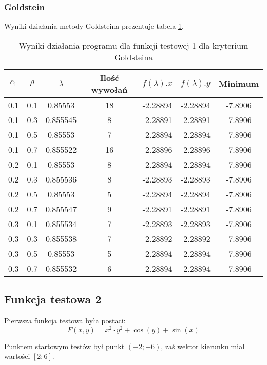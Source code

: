 \documentclass{classrep}
\begin{document}
\subsubsection{Goldstein}

Wyniki działania metody Goldsteina prezentuje tabela \ref{goldstein1}.

\begin{table}
  \centering
  \caption{Wyniki działania programu dla funkcji testowej 1 dla kryterium Goldsteina}
  \label{goldstein1}
  \begin{tabular}{|c|c|c|c|c|c|c|}
    \hline
    $c_1$ & $\rho$ & $\lambda$ & Ilość wywołań & $f(\lambda).x$ & $f(\lambda).y$ & Minimum \\
    \hline
    0.1 & 0.1 & 0.85553 & 18 & -2.28894 & -2.28894 & -7.8906 \\
    0.1 & 0.3 & 0.855545 & 8 & -2.28891 & -2.28891 & -7.8906 \\
    0.1 & 0.5 & 0.85553 & 7 & -2.28894 & -2.28894 & -7.8906 \\
    0.1 & 0.7 & 0.855522 & 16 & -2.28896 & -2.28896 & -7.8906 \\
    0.2 & 0.1 & 0.85553 & 8 & -2.28894 & -2.28894 & -7.8906 \\
    0.2 & 0.3 & 0.855536 & 8 & -2.28893 & -2.28893 & -7.8906 \\
    0.2 & 0.5 & 0.85553 & 5 & -2.28894 & -2.28894 & -7.8906 \\
    0.2 & 0.7 & 0.855547 & 9 & -2.28891 & -2.28891 & -7.8906 \\
    0.3 & 0.1 & 0.855534 & 7 & -2.28893 & -2.28893 & -7.8906 \\
    0.3 & 0.3 & 0.855538 & 7 & -2.28892 & -2.28892 & -7.8906 \\
    0.3 & 0.5 & 0.85553 & 5 & -2.28894 & -2.28894 & -7.8906 \\
    0.3 & 0.7 & 0.855532 & 6 & -2.28894 & -2.28894 & -7.8906 \\
    \hline
  \end{tabular}
\end{table}


\subsection{Funkcja testowa 2}
Pierwsza funkcja testowa była postaci:
\begin{equation}
 F(x, y) = x^2 \cdot y^2 + \cos(y) + \sin(x)
\end{equation}

Punktem startowym testów był punkt $(-2; -6)$, zaś wektor kierunku miał wartości $[2; 6]$.
\end{document}
